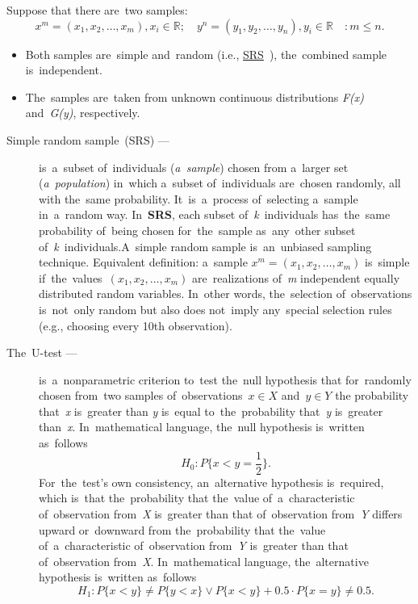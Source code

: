 \documentclass[]{scrreprt}
\begin{document}
Suppose that there are~two samples:
\begin{equation*}
x^{m} = (x_{1},x_{2},\ldots,x_{m}), x_{i} \in \mathbb{R};\quad y^{n} = (y_{1},y_{2},\ldots,y_{n}), y_{i} \in \mathbb{R} \quad: m \leq n.
\end{equation*}
%
\begin{itemize}
	\item Both samples are~simple and~random (i.e., \href{https://en.wikipedia.org/wiki/Simple_random_sample}{SRS}~\cite{Wiki:SRS}), the~combined sample is~independent.
	\item The~samples are~taken from unknown continuous distributions \textit{F(x)} and~\textit{G(y)}, respectively.
\end{itemize}
%
\begin{description}
	\item[Simple random sample~(SRS) ---] is~a~subset of~individuals (\emph{a~sample}) chosen from a~larger set (\emph{a~population}) in~which a~subset of~individuals are~chosen randomly, all with the~same probability. It~is~a~process of~selecting a~sample in~a~random way. In~\textbf{SRS}, each subset of~\textit{k}~individuals has~the~same probability of~being chosen for~the~sample as~any~other subset of~\textit{k}~individuals.A~simple random sample is~an~unbiased sampling technique. Equivalent definition: a~sample ${\textstyle x^{m} = (x_{1},x_{2},\ldots,x_{m})}$ is~simple if~the~values~${\textstyle (x_{1},x_{2},\ldots,x_{m})}$ are~realizations of~\textit{m} independent equally distributed random variables. In~other words, the~selection of~observations is~not~only random but also does not~imply any~special selection rules (e.g., choosing every 10th observation).
\end{description}
%
\begin{description}
	\item[The~U-test ---] is~a~nonparametric criterion to~test the~null hypothesis that for~randomly chosen from~two samples of~observations~$x \in X$ and~$y \in Y$ the probability that~\textit{x} is~greater than \textit{y} is~equal to~the~probability that~\textit{y} is~greater than~\textit{x}. In~mathematical language, the~null hypothesis is~written as~follows
	\begin{equation}\label{eq:U-test-null-hypothesis}
	H_{0}:P\{x<y=\frac{1}{2}\}.
	\end{equation}
	For~the~test's own consistency, an~alternative hypothesis is~required, which is~that the~probability that the~value of~a~characteristic of~observation from~\textit{X} is~greater than that of~observation from~\textit{Y} differs upward or~downward from the~probability that the~value of~a~characteristic of~observation from~\textit{Y} is~greater than that of~observation from~\textit{X}. In~mathematical language, the~alternative hypothesis is~written as~follows
	\begin{equation}\label{eq:U-test-alt-hypothesis}
	H_{1}:P\{x<y\} \neq P\{y<x\} \vee P\{x<y\} + 0.5 \cdot P\{x=y\} \neq 0.5.
	\end{equation}
\end{description}
\end{document}
